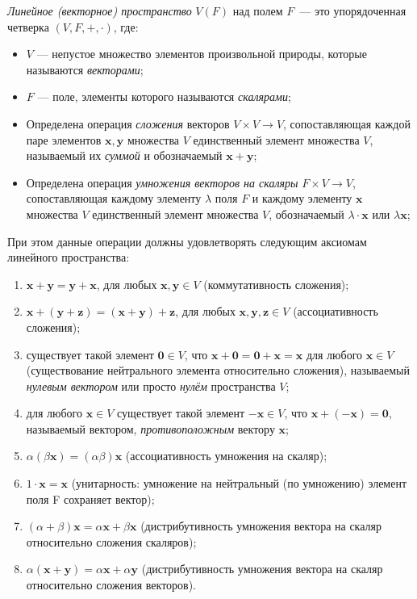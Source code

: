 \textit{Линейное (векторное) пространство} $V(F)$ над полем $F$~--- это упорядоченная четверка $(V,F,+,\cdot)$, где:
\begin{itemize}
	\itemsep0em
	\item $V$ --- непустое множество элементов произвольной природы, которые называются \textit{векторами};
	\item $F$ --- поле, элементы которого называются \textit{скалярами};
	\item Определена операция \textit{сложения} векторов $V\times V\to V$, сопоставляющая каждой паре элементов $\mathbf {x} ,\mathbf {y} $ множества $V$ единственный элемент множества $V$, называемый их \textit{суммой} и обозначаемый $\mathbf {x} +\mathbf {y}$;
	\item Определена операция \textit{умножения векторов на скаляры} $F\times V\to V$, сопоставляющая каждому элементу $\lambda$ поля $F$ и каждому элементу $\mathbf {x}$ множества $V$ единственный элемент множества $V$, обозначаемый $\lambda \cdot \mathbf {x}$ или $\lambda \mathbf {x}$;
\end{itemize}
При этом данные операции должны удовлетворять следующим аксиомам линейного пространства:
\begin{enumerate}
	\itemsep0em
	\item $\mathbf {x} +\mathbf {y} =\mathbf {y} +\mathbf {x}$, для любых $\mathbf {x} ,\mathbf {y} \in V$ (коммутативность сложения);
	\item $\mathbf {x} +(\mathbf {y} +\mathbf {z} )=(\mathbf {x} +\mathbf {y} )+\mathbf {z}$, для любых $\mathbf {x} ,\mathbf {y} ,\mathbf {z} \in V$ (ассоциативность сложения);
	\item существует такой элемент $\mathbf {0} \in V$, что ${\displaystyle \mathbf {x} +\mathbf {0} =\mathbf {0} +\mathbf {x} =\mathbf {x} }$ для любого $\mathbf {x} \in V$ (существование нейтрального элемента относительно сложения), называемый \textit{нулевым вектором} или просто \textit{нулём} пространства $V$;
	\item для любого $\mathbf {x} \in V$ существует такой элемент $-\mathbf {x} \in V$, что $\mathbf {x} +(-\mathbf {x} )=\mathbf {0}$, называемый вектором, \textit{противоположным} вектору $\mathbf {x}$;
	\item $\alpha (\beta \mathbf {x} )=(\alpha \beta )\mathbf {x}$ (ассоциативность умножения на скаляр);
	\item $1\cdot \mathbf {x} =\mathbf {x}$ (унитарность: умножение на нейтральный (по умножению) элемент поля F сохраняет вектор);
	\item $(\alpha +\beta )\mathbf {x} =\alpha \mathbf {x} +\beta \mathbf {x}$ (дистрибутивность умножения вектора на скаляр относительно сложения скаляров);
	\item $\alpha (\mathbf {x} +\mathbf {y} )=\alpha \mathbf {x} +\alpha \mathbf {y}$ (дистрибутивность умножения вектора на скаляр относительно сложения векторов).
\end{enumerate}

